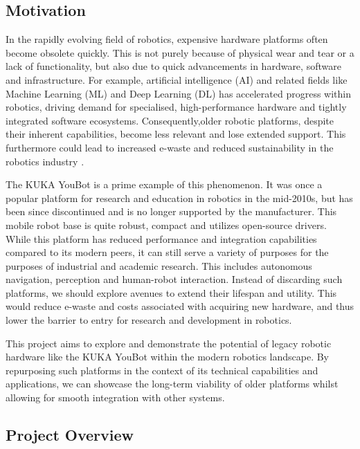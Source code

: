 \documentclass[a4paper, 12pt]{article}
\newif\ifshownotes
\newcommand{\notes}[1]{\ifshownotes\textcolor{blue}{#1}\fi}
\begin{document}
    \subsection{Motivation}

    \notes{draft \#2}

    In the rapidly evolving field of robotics, expensive hardware platforms often become obsolete quickly. This is not purely because of physical wear and tear or a lack of functionality, but also due to quick advancements in hardware, software and infrastructure. For example, artificial intelligence (AI) and related fields like Machine Learning (ML) and Deep Learning (DL) has accelerated progress within robotics, driving demand for specialised, high-performance hardware and tightly integrated software ecosystems. Consequently,older robotic platforms, despite their inherent capabilities, become less relevant and lose extended support. This furthermore could lead to increased e-waste and reduced sustainability in the robotics industry \cite{KARASTOYANOV201844}. 

    The KUKA YouBot is a prime example of this phenomenon. It was once a popular platform for research and education in robotics in the mid-2010s, but has been since discontinued and is no longer supported by the manufacturer. This mobile robot base is quite robust, compact and utilizes open-source drivers. While this platform has reduced performance and integration capabilities compared to its modern peers, it can still serve a variety of purposes for the purposes of industrial and academic research. This includes autonomous navigation, perception and human-robot interaction. Instead of discarding such platforms, we should explore avenues to extend their lifespan and utility. This would reduce e-waste and costs associated with acquiring new hardware, and thus lower the barrier to entry for research and development in robotics.
    
    This project aims to explore and demonstrate the potential of legacy robotic hardware like the KUKA YouBot within the modern robotics landscape. By repurposing such platforms in the context of its technical capabilities and applications, we can showcase the long-term viability of older platforms whilst allowing for smooth integration with other systems. 

    \subsection{Project Overview}
\end{document}
